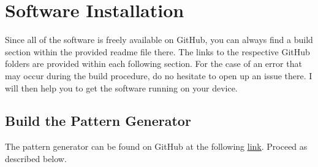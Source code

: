 \chapter{Software Installation}
\label{sec::A_si}
Since all of the software is freely available on GitHub, you can always find a build section within the provided readme file there. The links to the respective GitHub folders are provided within each following section. For the case of an error that may occur during the build procedure, do no hesitate to open up an issue there. I will then help you to get the software running on your device.
\section{Build the Pattern Generator}
\label{sec::A1_pg}
The pattern generator can be found on GitHub at the following \href{https://github.com/mhubii/nmpc_pattern_generator}{\underline{link}}. Proceed as described below.

